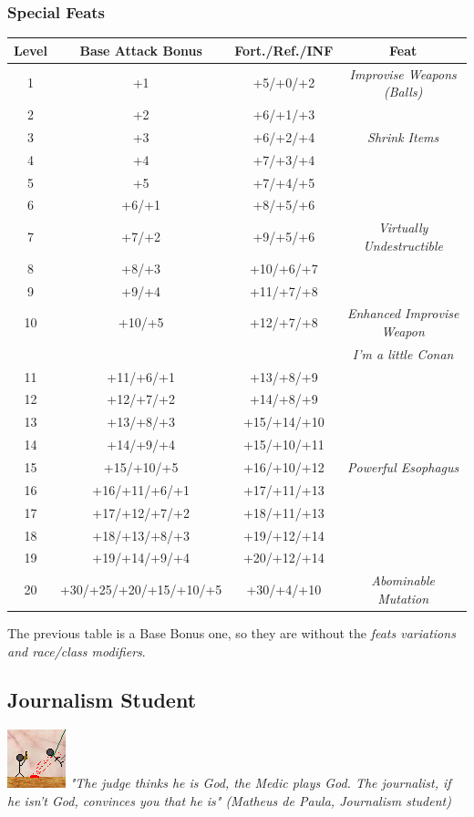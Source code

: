 \documentclass[ letterpaper,12pt]{article}
\begin{document}
\subsubsection{Special Feats}

\begin{center} \begin{tabular}{|c||c|c|c|}
\hline
{\bf Level}&{\bf Base Attack Bonus}&{\bf Fort./Ref./INF}&{\bf Feat}\\
\hline
1&+1&+5/+0/+2&{\it Improvise Weapons (Balls)}\\
\hline
2&+2&+6/+1/+3&\\
\hline
3&+3&+6/+2/+4&{\it Shrink Items}\\
\hline
4&+4&+7/+3/+4&\\
\hline
5&+5&+7/+4/+5&\\
\hline
6&+6/+1&+8/+5/+6&\\
\hline
7&+7/+2&+9/+5/+6&{\it Virtually Undestructible}\\
\hline
8&+8/+3&+10/+6/+7&\\
\hline
9&+9/+4&+11/+7/+8&\\
\hline
10&+10/+5&+12/+7/+8&{\it Enhanced Improvise Weapon}\\
  &      &         &{\it I'm a little Conan}\\
\hline
11&+11/+6/+1&+13/+8/+9&\\
\hline
12&+12/+7/+2&+14/+8/+9&\\
\hline
13&+13/+8/+3&+15/+14/+10&\\
\hline
14&+14/+9/+4&+15/+10/+11&\\
\hline
15&+15/+10/+5&+16/+10/+12&{\it Powerful Esophagus}\\
\hline
16&+16/+11/+6/+1&+17/+11/+13&\\
\hline
17&+17/+12/+7/+2&+18/+11/+13&\\
\hline
18&+18/+13/+8/+3&+19/+12/+14&\\
\hline
19&+19/+14/+9/+4&+20/+12/+14&\\
\hline
20&+30/+25/+20/+15/+10/+5&+30/+4/+10&{\it Abominable Mutation}\\
\hline
\end{tabular} \end{center}

The previous table is a Base Bonus one, so they are without the {\it feats variations and race/class modifiers}.\\

\subsection{Journalism Student}
\includegraphics{../data/classes/Img/jornalismo.png}
{\it "The judge thinks he is God, the Medic plays God. The journalist, if he isn't God, convinces you that he is" (Matheus de Paula, Journalism student)}\\
\end{document}
